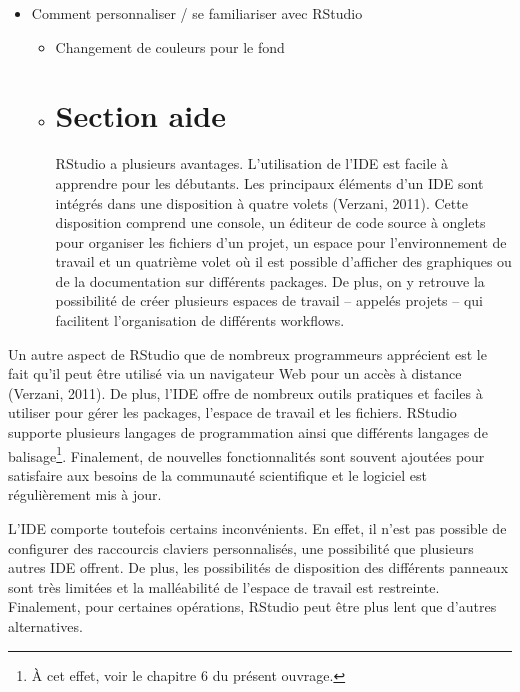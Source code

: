 \documentclass[
  letterpaper,
  DIV=11,
  numbers=noendperiod]{scrreprt}
\providecommand{\tightlist}{%
  \setlength{\itemsep}{0pt}\setlength{\parskip}{0pt}}\usepackage{longtable,booktabs,array}
\begin{document}
\begin{itemize}
\tightlist
\item
  Comment personnaliser / se familiariser avec RStudio

  \begin{itemize}
  \item
    Changement de couleurs pour le fond
  \item

    \hypertarget{section-aide}{%
    \chapter{Section aide}\label{section-aide}}

    RStudio a plusieurs avantages. L'utilisation de l'IDE est facile à
    apprendre pour les débutants. Les principaux éléments d'un IDE sont
    intégrés dans une disposition à quatre volets (Verzani, 2011). Cette
    disposition comprend une console, un éditeur de code source à
    onglets pour organiser les fichiers d'un projet, un espace pour
    l'environnement de travail et un quatrième volet où il est possible
    d'afficher des graphiques ou de la documentation sur différents
    packages. De plus, on y retrouve la possibilité de créer plusieurs
    espaces de travail -- appelés projets -- qui facilitent
    l'organisation de différents workflows.
  \end{itemize}
\end{itemize}

Un autre aspect de RStudio que de nombreux programmeurs apprécient est
le fait qu'il peut être utilisé via un navigateur Web pour un accès à
distance (Verzani, 2011). De plus, l'IDE offre de nombreux outils
pratiques et faciles à utiliser pour gérer les packages, l'espace de
travail et les fichiers. RStudio supporte plusieurs langages de
programmation ainsi que différents langages de balisage\footnote{À cet
  effet, voir le chapitre 6 du présent ouvrage.}. Finalement, de
nouvelles fonctionnalités sont souvent ajoutées pour satisfaire aux
besoins de la communauté scientifique et le logiciel est régulièrement
mis à jour.

L'IDE comporte toutefois certains inconvénients. En effet, il n'est pas
possible de configurer des raccourcis claviers personnalisés, une
possibilité que plusieurs autres IDE offrent. De plus, les possibilités
de disposition des différents panneaux sont très limitées et la
malléabilité de l'espace de travail est restreinte. Finalement, pour
certaines opérations, RStudio peut être plus lent que d'autres
alternatives.
\end{document}

